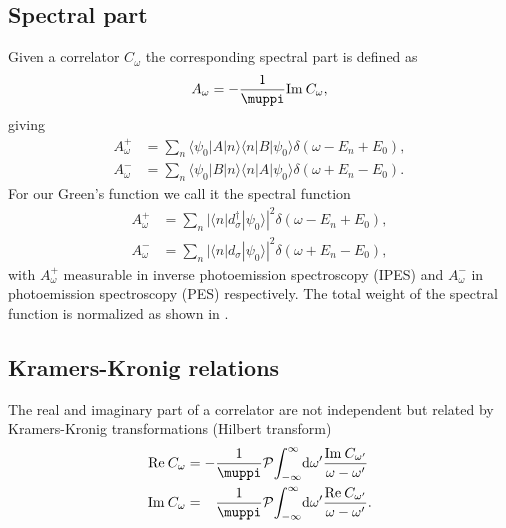 \subsection{Spectral part}

Given a correlator $C_\omega$ the corresponding spectral part is defined as
\begin{equation}
    A_\omega = -\frac{1}{\muppi}\Im C_\omega,
\end{equation}
giving
\begin{subequations}
    \begin{align}
        A^+_\omega
         & =
        \sum_n \langle\psi_0 | A | n\rangle\langle n | B | \psi_0\rangle \delta(\omega - E_n + E_0),
        \label{eq:spectral-part-plus} \\
        A^-_\omega
         & =
        \sum_n \langle\psi_0 | B | n\rangle\langle n | A | \psi_0\rangle \delta(\omega + E_n - E_0).
        \label{eq:spectral-part-minus}
    \end{align}
\end{subequations}
For our Green's function we call it the spectral function
\begin{subequations}
    \begin{align}
        A^+_\omega
         & =
        \sum_n |\langle n | d_\sigma^\dag | \psi_0\rangle|^2 \delta(\omega - E_n + E_0), \\
        A^-_\omega
         & =
        \sum_n |\langle n | d_\sigma | \psi_0\rangle|^2 \delta(\omega + E_n - E_0),
    \end{align}
\end{subequations}
with $A^+_\omega$ measurable in inverse photoemission spectroscopy (IPES)
and $A^-_\omega$ in photoemission spectroscopy (PES) respectively.
The total weight of the spectral function is normalized
as shown in .


\subsection{Kramers-Kronig relations}

The real and imaginary part of a correlator are not independent
but related by Kramers-Kronig transformations (Hilbert transform)
\begin{subequations}
    \begin{align}
        \Re C_\omega
         & =
        - \frac{1}{\muppi} \mathcal{P}\! \int_{-\infty}^\infty\! \md\omega'
        \frac{\Im C_{\omega'}}{\omega - \omega'}
        \label{eq:kramers-kroneg-real} \\
        \Im C_\omega
         & =
        \phantom{-} \frac{1}{\muppi} \mathcal{P}\! \int_{-\infty}^\infty\! \md\omega'
        \frac{\Re C_{\omega'}}{\omega - \omega'}.
        \label{eq:kramers-kronig-imag}
    \end{align}
\end{subequations}

